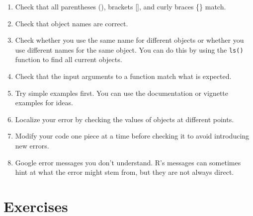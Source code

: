 \documentclass[
  letterpaper,
]{krantz}
\begin{document}
\begin{enumerate}
\def\labelenumi{\arabic{enumi}.}
\item
  Check that all parentheses (), brackets {[}{]}, and curly braces \{\}
  match.
\item
  Check that object names are correct.
\item
  Check whether you use the same name for different objects or whether
  you use different names for the same object. You can do this by using
  the \texttt{ls()} function to find all current objects.
\item
  Check that the input arguments to a function match what is expected.
\item
  Try simple examples first. You can use the documentation or vignette
  examples for ideas.
\item
  Localize your error by checking the values of objects at different
  points.
\item
  Modify your code one piece at a time before checking it to avoid
  introducing new errors.
\item
  Google error messages you don't understand. R's messages can sometimes
  hint at what the error might stem from, but they are not always
  direct.
\end{enumerate}

\section{Exercises}\label{exercises-11}
\end{document}
